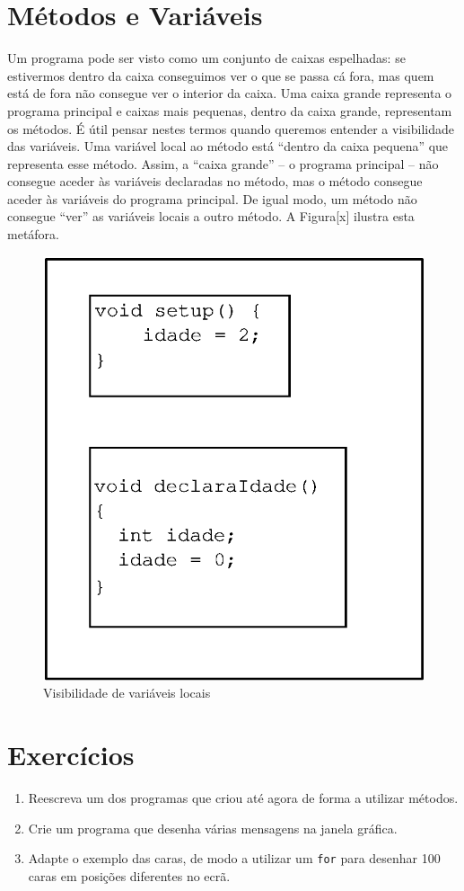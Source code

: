 \section{Métodos e Variáveis}
Um programa pode ser visto como um conjunto de caixas espelhadas: se estivermos dentro da caixa conseguimos ver o que se passa cá fora, mas quem está de fora não consegue ver o interior da caixa.
Uma caixa grande representa o programa principal e caixas mais pequenas, dentro da caixa grande, representam os métodos. É útil pensar nestes termos quando queremos entender a visibilidade das variáveis. Uma variável local ao método está ``dentro da caixa pequena'' que representa esse método. Assim, a ``caixa grande'' -- o programa principal -- não consegue aceder às variáveis declaradas no método, mas o método consegue aceder às variáveis do programa principal. De igual modo, um método não consegue ``ver'' as variáveis locais a outro método. A Figura[x] ilustra esta metáfora.
\begin{figure}
	\centering
		\includegraphics{images/cap6-visibilidade-1.eps}
	\caption{Visibilidade de variáveis locais}
	\label{fig:cap6-visibilidade-1}
\end{figure}

\section{Exercícios}
\begin{enumerate}
\item 
Reescreva um dos programas que criou até agora de forma a utilizar métodos.

\item 
Crie um programa que desenha várias mensagens na janela gráfica.

\item
Adapte o exemplo das caras, de modo a utilizar um \texttt{for} para desenhar 100 caras em posições diferentes no ecrã.
\end{enumerate}